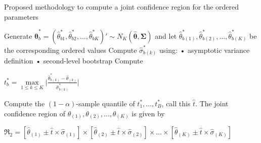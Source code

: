 \documentclass[
  11pt,
  ignorenonframetext,
]{beamer}
\begin{document}
\begin{frame}{Proposed methodology to compute a joint confidence region
for the ordered parameters}
\label{sec:nonrank}
\begin{minipage}{1.0\textwidth}
\begin{algorithmic}[1]
        \State
            Generate $\hat{\boldsymbol{\theta}}^*_b = \left( \hat{\theta}^*_{b1}, \hat{\theta}^*_{b2}, \dots, \hat{\theta}^*_{bK} \right)' \sim N_K \left( \boldsymbol{\hat \theta}, \boldsymbol {\Sigma} \right)$ and let $\hat{\theta}^*_{b(1)}, \hat{\theta}^*_{b(2)}, \dots, \hat{\theta}^*_{b(K)}$ be the corresponding ordered values
        \State
        Compute $\hat\sigma^*_{b(k)}$ using:
        \Statex \qquad • asymptotic variance definition 
        \Statex \qquad • second-level bootstrap 
        \State
            Compute
\Statex
\begin{center}
$t^*_b = \underset{1 \leq k \leq K}{\max} \Bigg| \frac{\hat\theta^*_{b(k)} - \hat\theta_{(k)}}{\hat\sigma^*_{b(k)}} \Bigg|$
\end{center}
    \EndFor
    \State Compute the $\left(1-\alpha\right)$-sample quantile of $t^*_1, \dots, t^*_B$, call this $\hat{t}$.
    \State The joint confidence region of $\theta_{(1)}, \theta_{(2)}, \dots, \theta_{(K)}$ is given by
\Statex
\begin{center}
    $\mathfrak{R}_2 = \left[ \hat\theta_{(1)} \pm \hat t \times \hat\sigma_{(1)}  \right] \times \left[ \hat\theta_{(2)} \pm \hat t \times \hat\sigma_{(2)}  \right] \times \dots \times \left[ \hat\theta_{(K)} \pm \hat t \times \hat\sigma_{(K)}  \right]$
\end{center}
    \end{algorithmic}
\end{minipage}

\end{frame}
\end{document}
